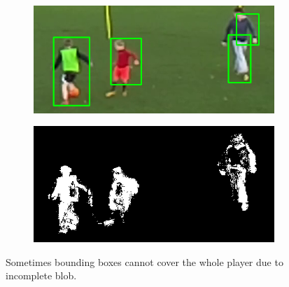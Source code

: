\documentclass{article}
\begin{document}
\begin{figure}[h!]
  \begin{subfigure}[b]{\linewidth}
  \centering
    \includegraphics[scale=0.4]{report/pic/3/multi_box_2.png} 
  \end{subfigure}
  \begin{subfigure}[b]{\linewidth}
  \centering
    \includegraphics[scale=0.4]{report/pic/3/multi_box_1.png} 
  \end{subfigure}
  \caption{Sometimes bounding boxes cannot cover the whole player due to incomplete blob.}
\end{figure}
\end{document}

